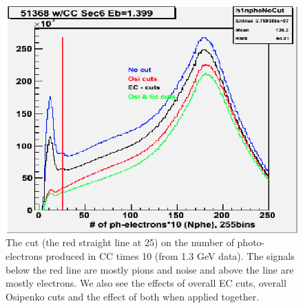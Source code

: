 \begin{figure}[] %
\centering
  \leavevmode \includegraphics[width=1.0\textwidth]{figuresEG4/FigCuts/npheOldPlotFrom2008_p1nphe13G_EcOsiLoose_dt11.png}  %
\caption[CC-photoelectron number cut]{The cut (the red straight line at 25) on the number of photo-electrons produced in CC times 10 (from 1.3 GeV data). The signals below the red line are mostly pions and noise and above the line are mostly electrons. We also see the effects of overall EC cuts, overall Osipenko cuts and the effect of both when applied together.
}
\label{npheCt}
\end{figure}
